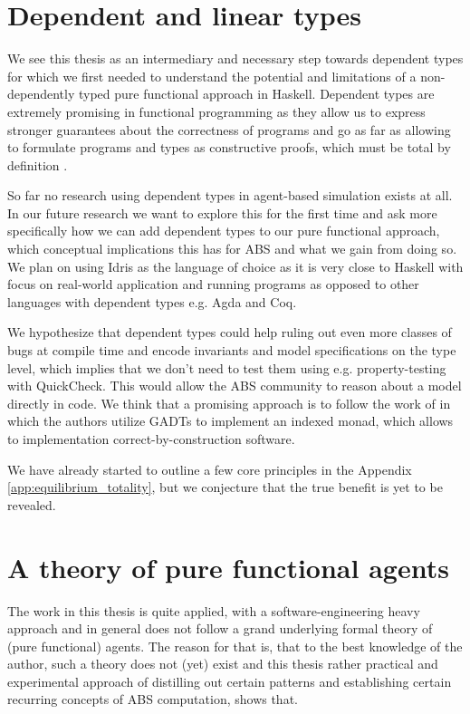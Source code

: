 \section{Dependent and linear types}
We see this thesis as an intermediary and necessary step towards dependent types for which we first needed to understand the potential and limitations of a non-dependently typed pure functional approach in Haskell. Dependent types are extremely promising in functional programming as they allow us to express stronger guarantees about the correctness of programs and go as far as allowing to formulate programs and types as constructive proofs, which must be total by definition \cite{altenkirch_pi_2010, altenkirch_why_2005, thompson_type_1991}.

So far no research using dependent types in agent-based simulation exists at all. In our future research we want to explore this for the first time and ask more specifically how we can add dependent types to our pure functional approach, which conceptual implications this has for ABS and what we gain from doing so. We plan on using Idris \cite{brady_idris_2013} as the language of choice as it is very close to Haskell with focus on real-world application and running programs as opposed to other languages with dependent types e.g. Agda and Coq.

We hypothesize that dependent types could help ruling out even more classes of bugs at compile time and encode invariants and model specifications on the type level, which implies that we don't need to test them using e.g. property-testing with QuickCheck. This would allow the ABS community to reason about a model directly in code. We think that a promising approach is to follow the work of \cite{brady_programming_2013, brady_state_2016, fowler_dependent_2014} in which the authors utilize GADTs to implement an indexed monad, which allows to implementation correct-by-construction software.

We have already started to outline a few core principles in the Appendix \ref{app:equilibrium_totality}, but we conjecture that the true benefit is yet to be revealed.

\section{A theory of pure functional agents}
The work in this thesis is quite applied, with a software-engineering heavy approach and in general does not follow a grand underlying formal theory of (pure functional) agents. The reason for that is, that to the best knowledge of the author, such a theory does not (yet) exist and this thesis rather practical and experimental approach of distilling out certain patterns and establishing certain recurring concepts of ABS computation, shows that.

